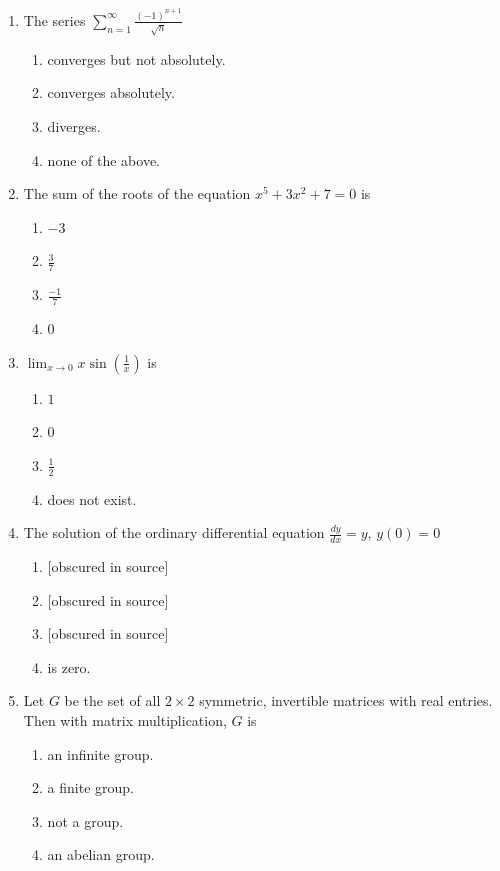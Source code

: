 \documentclass[11pt, a4paper]{article}
\begin{document}
\begin{enumerate}
  \item The series $\displaystyle \sum_{n=1}^\infty \frac{(-1)^{n+1}}{\sqrt{n}}$
  \begin{enumerate}[label=(\alph*)]
    \item converges but not absolutely.
    \item converges absolutely.
    \item diverges.
    \item none of the above.
  \end{enumerate}

  \item The sum of the roots of the equation $x^5 + 3x^2 + 7 = 0$ is
  \begin{enumerate}[label=(\alph*)]
    \item $-3$
    \item $\frac{3}{7}$
    \item $\frac{-1}{7}$
    \item $0$
  \end{enumerate}

  \item $\displaystyle \lim_{x \to 0} x \sin\left(\frac{1}{x}\right)$ is
  \begin{enumerate}[label=(\alph*)]
    \item $1$
    \item $0$
    \item $\frac{1}{2}$
    \item does not exist.
  \end{enumerate}

  \item The solution of the ordinary differential equation $\displaystyle \frac{dy}{dx} = y$, $y(0) = 0$
  \begin{enumerate}[label=(\alph*)]
    \item {[obscured in source]}
    \item {[obscured in source]}
    \item {[obscured in source]}
    \item is zero.
  \end{enumerate}

  \item Let $G$ be the set of all $2 \times 2$ symmetric, invertible matrices with real entries. Then with matrix multiplication, $G$ is
  \begin{enumerate}[label=(\alph*)]
    \item an infinite group.
    \item a finite group.
    \item not a group.
    \item an abelian group.
  \end{enumerate}
\end{enumerate}
\end{document}
